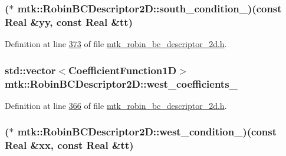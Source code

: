 \hypertarget{classmtk_1_1RobinBCDescriptor2D_aa45a1867ab80b81966f4221bbdb576ff}{
\subsubsection[{south\+\_\+condition\+\_\+}]{($\ast$ mtk\+::\+Robin\+B\+C\+Descriptor2\+D\+::south\+\_\+condition\+\_\+)(const {\bf Real} \&yy, const {\bf Real} \&tt)\hspace{0.3cm}{\ttfamily [private]}}}\label{classmtk_1_1RobinBCDescriptor2D_aa45a1867ab80b81966f4221bbdb576ff}


Definition at line \hyperlink{mtk__robin__bc__descriptor__2d_8h_source_l00373}{373} of file \hyperlink{mtk__robin__bc__descriptor__2d_8h_source}{mtk\+\_\+robin\+\_\+bc\+\_\+descriptor\+\_\+2d.\+h}.

\hypertarget{classmtk_1_1RobinBCDescriptor2D_a1f341dc6485b78acf5408d22c87a6dd1}{
\subsubsection[{west\+\_\+coefficients\+\_\+}]{\setlength{\rightskip}{0pt plus 5cm}std\+::vector$<${\bf Coefficient\+Function1\+D}$>$ mtk\+::\+Robin\+B\+C\+Descriptor2\+D\+::west\+\_\+coefficients\+\_\+\hspace{0.3cm}{\ttfamily [private]}}}\label{classmtk_1_1RobinBCDescriptor2D_a1f341dc6485b78acf5408d22c87a6dd1}


Definition at line \hyperlink{mtk__robin__bc__descriptor__2d_8h_source_l00366}{366} of file \hyperlink{mtk__robin__bc__descriptor__2d_8h_source}{mtk\+\_\+robin\+\_\+bc\+\_\+descriptor\+\_\+2d.\+h}.

\hypertarget{classmtk_1_1RobinBCDescriptor2D_a3d04c776a3fa34cf4fea7c484e2056d6}{
\subsubsection[{west\+\_\+condition\+\_\+}]{($\ast$ mtk\+::\+Robin\+B\+C\+Descriptor2\+D\+::west\+\_\+condition\+\_\+)(const {\bf Real} \&xx, const {\bf Real} \&tt)\hspace{0.3cm}{\ttfamily [private]}}}\label{classmtk_1_1RobinBCDescriptor2D_a3d04c776a3fa34cf4fea7c484e2056d6}


